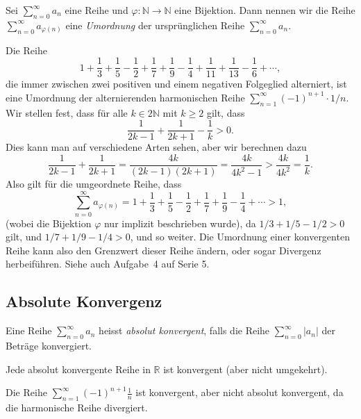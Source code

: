\documentclass[../main.tex]{subfiles}
\begin{document}
\begin{definition}
  Sei $\sum_{n=0}^{\infty} a_n$ eine Reihe und
  $\varphi \colon \mathbb{N} \to \mathbb{N}$ eine
  Bijektion. Dann nennen wir die Reihe
  $\sum_{n=0}^{\infty} a_{\varphi(n)}$ eine
  \emph{Umordnung} der ursprünglichen
  Reihe $\sum_{n=0}^{\infty} a_n$.
\end{definition}

\begin{example}
  Die Reihe
  \[
    1 + \frac{1}{3} + \frac{1}{5} - \frac{1}{2}
    + \frac{1}{7} + \frac{1}{9} - \frac{1}{4}
    + \frac{1}{11} + \frac{1}{13} - \frac{1}{6}
    + \cdots,
  \]
  die immer zwischen zwei positiven und einem
  negativen Folgeglied alterniert,
  ist eine Umordnung der
  alternierenden harmonischen Reihe
  $\sum_{n=1}^{\infty} {(-1)}^{n+1} \cdot 1/n$.
  Wir stellen fest, dass für alle
  $k \in 2 \mathbb{N}$ mit $k \geq 2$ gilt,
  dass
  \[
    \frac{1}{2k-1} + \frac{1}{2k+1} - \frac{1}{k} > 0.
  \]
  Dies kann man auf verschiedene Arten sehen,
  aber wir berechnen dazu
  \[
    \frac{1}{2k-1} + \frac{1}{2k+1} = \frac{4k}{(2k-1)(2k+1)}
    = \frac{4k}{4k^2 - 1} > \frac{4k}{4k^2} = \frac{1}{k}.
  \]
  Also gilt für die umgeordnete Reihe, dass
  \[
    \sum_{n=0}^{\infty} a_{\varphi(n)} = 
    1 + \frac{1}{3} + \frac{1}{5} - \frac{1}{2}
    + \frac{1}{7} + \frac{1}{9} - \frac{1}{4} + \cdots > 1,
  \]
  (wobei die Bijektion $\varphi$ nur implizit
  beschrieben wurde), da
  $1/3 + 1/5 - 1/2 > 0$ gilt, und $1/7 + 1/9 - 1/4 > 0$,
  und so weiter.
  Die Umordnung einer konvergenten Reihe kann also den
  Grenzwert dieser Reihe ändern,
  oder sogar Divergenz herbeiführen. Siehe auch Aufgabe~4
  auf Serie 5.
\end{example}

\subsection*{Absolute Konvergenz}
\begin{definition}
  Eine Reihe $\sum_{n=0}^{\infty} a_n$ heisst
  \emph{absolut konvergent}, falls die Reihe
  $\sum_{n=0}^{\infty} |a_n|$ der Beträge konvergiert.
\end{definition}

\begin{lemma*}
  Jede absolut konvergente Reihe in
  $\mathbb{R}$ ist konvergent (aber nicht umgekehrt).
\end{lemma*}

\begin{example}
  Die Reihe
  $\sum_{n=1}^{\infty} {(-1)}^{n+1}\frac{1}{n}$ 
  ist konvergent, aber
  nicht absolut konvergent, da die harmonische Reihe divergiert.
\end{example}
\end{document}
